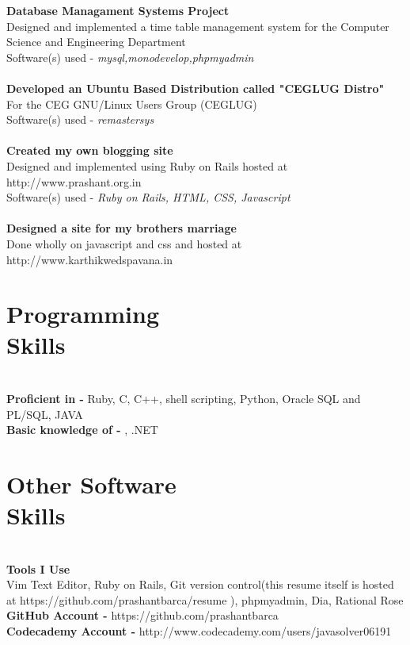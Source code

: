 \documentclass[margin,line]{resume}
\begin{document}
\begin{resume}
    \textbf{Database Managament Systems Project} \\Designed and implemented a time table management system for the Computer Science and Engineering Department \vspace{2mm}\\\vspace{1mm}%
    Software(s) used -  \textsl{mysql,monodevelop,phpmyadmin}\\
    \\\textbf{Developed an Ubuntu Based Distribution called "CEGLUG Distro"} \\For the CEG GNU/Linux Users Group (CEGLUG) \vspace{2mm}\\\vspace{1mm}%
    Software(s) used -  \textsl{remastersys}\\
    \\\textbf{Created my own blogging site} \\Designed and implemented using Ruby on Rails hosted at http://www.prashant.org.in \vspace{2mm}\\\vspace{1mm}%
    Software(s) used -  \textsl{Ruby on Rails, HTML, CSS, Javascript}\\
    \\\textbf{Designed a site for my brothers marriage} \\Done wholly on javascript and css and hosted at http://www.karthikwedspavana.in  \vspace{2mm}\\\vspace{1mm}%

    \section{\mysidestyle Programming\\Skills}\\ 
    \textbf{Proficient in -}  Ruby, C, C++, shell scripting, Python, Oracle SQL and PL/SQL, JAVA
\\\textbf{Basic knowledge of -}  \LaTeXe, .NET 

    \section{\mysidestyle Other Software\\Skills} \\
    \textbf{Tools I Use}  \\Vim Text Editor, Ruby on Rails, Git version control(this resume itself is hosted at https://github.com/prashantbarca/resume ), phpmyadmin, Dia, Rational Rose
    \\\textbf{GitHub Account -}  https://github.com/prashantbarca
    \\\textbf{Codecademy Account -}  http://www.codecademy.com/users/javasolver06191

\end{resume}
\end{document}
